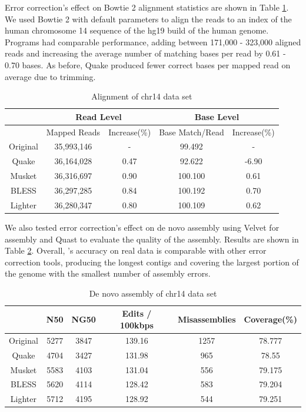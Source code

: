 \documentclass{bmcart}
\begin{document}
Error correction's effect on Bowtie 2 alignment statistics are shown in Table \ref{table:chr14_alignment}.  We used Bowtie 2 with default parameters to align the reads to an index of the human chromosome 14 sequence of the hg19 build of the human genome.  Programs had comparable performance, adding between 171,000 - 323,000 aligned reads and increasing the average number of matching bases per read by 0.61 - 0.70 bases. As before, Quake produced fewer correct bases per mapped read on average due to trimming.   

\begin{table}
\centering
\begin{tabular}{|c|c|c||c|c|}\hline
  & \multicolumn{2}{|c||}{Read Level} & \multicolumn{2}{|c|}{Base Level} \\ \hline
  & Mapped Reads  &Increase(\%) & Base Match/Read	& Increase(\%) \\ \hline
Original & 35,993,146	&- 		&	99.492	& - \\ \hline
Quake 	& 36,164,028	& 0.47 &	92.622	& -6.90 \\ \hline
Musket 	&	36,316,697	& 0.90	& 100.100	& 0.61 \\ \hline
BLESS 	&36,297,285	& 0.84	& 100.192	&	0.70 \\ \hline
Lighter	&36,280,347	& 0.80	& 100.109	& 0.62 \\ \hline
\end{tabular}
\caption{Alignment of chr14 data set\label{table:chr14_alignment}}
\end{table}

We also tested error correction's effect on de novo assembly using Velvet for assembly and Quast to evaluate the quality of the assembly.  Results are shown in Table \ref{table:chr14_assembly}.  Overall, \tool's accuracy on real data is comparable with other error correction tools, producing the longest contigs and covering the largest portion of the genome with the smallest number of assembly errors.   

\begin{table}
\centering
\begin{tabular}{|c|c|c|c|c|c|} \hline
	   & N50 &	NG50	& Edits / 100kbps &	Misassemblies	& Coverage(\%) \\ \hline
Original &	5277	&3847	&139.16	&1257	&78.777 \\ \hline
Quake	&	4704	&3427	&131.98	&965	&78.55 \\ \hline
Musket	&	5583	&4103	&131.04	&556	&79.175 \\ \hline
BLESS	&	5620	&4114	&128.42	&583	&79.204 \\ \hline
Lighter	&	5712	&4195	&128.92	&544	&79.251 \\ \hline

\end{tabular}
\caption{De novo assembly of chr14 data set\label{table:chr14_assembly}}
\end{table}
\end{document}
